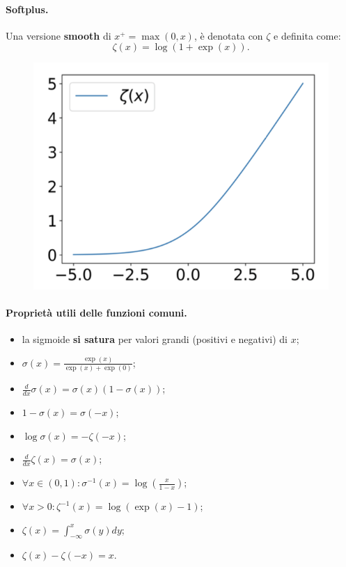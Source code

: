 \paragraph{Softplus.} Una versione \textbf{smooth} di $x^+=\max(0,x)$, è denotata con $\zeta$ e definita come:
\begin{equation}
    \zeta(x)=\log(1+\exp(x)).
\end{equation}
\begin{figure}[!h]
    \includegraphics[scale=.7]{images/prerequisites/softplus.png}
    \centering
\end{figure}



\paragraph{Proprietà utili delle funzioni comuni.}
\begin{itemize}
    \item la sigmoide \textbf{si satura} per valori grandi (positivi e negativi) di $x$;
    \item $\sigma(x)=\frac{\exp(x)}{\exp(x)+\exp(0)}$;
    \item $\frac{d}{dx}\sigma(x)=\sigma(x)(1-\sigma(x))$;
    \item $1-\sigma(x)=\sigma(-x)$;
    \item $\log\sigma(x)=-\zeta(-x)$;
    \item $\frac{d}{dx}\zeta(x)=\sigma(x)$;
    \item $\forall x\in(0,1):\sigma^{-1}(x)=\log(\frac{x}{1-x})$;
    \item $\forall x>0:\zeta^{-1}(x)=\log(\exp(x)-1)$;
    \item $\zeta(x)=\int^x_{-\infty}\sigma(y)dy$;
    \item $\zeta(x)-\zeta(-x)=x$.
\end{itemize}
\newpage
